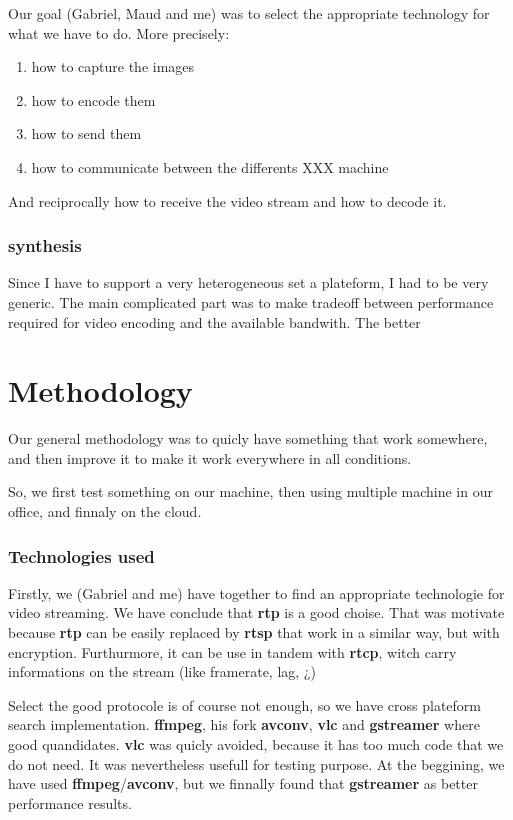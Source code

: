 \documentclass[a4paper,11pt]{custom}
\newcommand{\rtp}{\textbf{rtp}}
\newcommand{\rtcp}{\textbf{rtcp}}
\newcommand{\rtsp}{\textbf{rtsp}}
\newcommand{\vlc}{\textbf{vlc}}
\newcommand{\avconv}{\textbf{avconv}}
\newcommand{\ffmpeg}{\textbf{ffmpeg}}
\newcommand{\gstreamer}{\textbf{gstreamer}}
\begin{document}
Our goal (Gabriel, Maud and me) was to select the appropriate technology for
what we have to do. More precisely:
\begin{enumerate}
\item how to capture the images
\item how to encode them
\item how to send them
\item how to communicate between the differents XXX machine
\end{enumerate}
And reciprocally how to receive the video stream and how to decode it.

\subsection{synthesis}

Since I have to support a very heterogeneous set a plateform, I had to be very
generic.
The main complicated part was to make tradeoff between performance required for
video encoding and the available bandwith. The better

\chapter{Methodology}

Our general methodology was to quicly have something that work somewhere, and
then improve it to make it work everywhere in all conditions.

So, we first test something on our machine, then using multiple machine in our
office, and finnaly on the cloud.

\subsection{Technologies used}

Firstly, we (Gabriel and me) have together to find an appropriate technologie
for video streaming. We have conclude that \rtp{} is a good choise. That was
motivate because \rtp{} can be easily replaced by \rtsp{} that work in a similar
way, but with encryption. Furthurmore, it can be use in tandem with \rtcp, witch
carry informations on the stream (like framerate, lag, ¿)

Select the good protocole is of course not enough, so we have cross plateform
search implementation. \ffmpeg, his fork \avconv, \vlc{} and \gstreamer{} where good
quandidates. \vlc{} was quicly avoided, because it has too much code that we do not
need. It was nevertheless usefull for testing purpose. At the beggining, we have
used \ffmpeg/\avconv, but we finnally found that \gstreamer{} as better performance
results.
\end{document}
